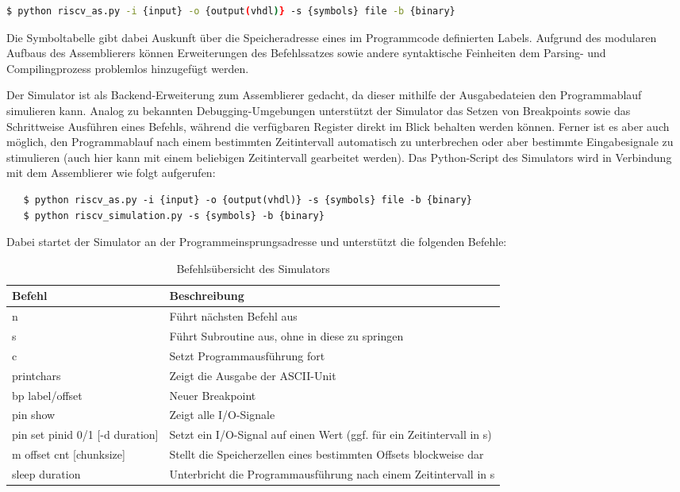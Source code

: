 \begin{lstlisting}[language=bash]
   $ python riscv_as.py -i {input} -o {output(vhdl)} -s {symbols} file -b {binary}
\end{lstlisting}

Die Symboltabelle gibt dabei Auskunft \"uber die Speicheradresse eines im Programmcode definierten Labels. Aufgrund des modularen Aufbaus des Assemblierers k\"onnen Erweiterungen des Befehlssatzes sowie andere syntaktische Feinheiten dem Parsing- und Compilingprozess problemlos hinzugef\"ugt werden.

 
Der Simulator ist als Backend-Erweiterung zum Assemblierer gedacht, da dieser mithilfe der Ausgabedateien den Programmablauf simulieren kann. Analog zu bekannten Debugging-Umgebungen unterst\"utzt der Simulator das Setzen von Breakpoints sowie das Schrittweise Ausf\"uhren eines Befehls, w\"ahrend die verf\"ugbaren Register direkt im Blick behalten werden k\"onnen. Ferner ist es aber auch m\"oglich, den Programmablauf nach einem bestimmten Zeitintervall automatisch zu unterbrechen oder aber bestimmte Eingabesignale zu stimulieren (auch hier kann mit einem beliebigen Zeitintervall gearbeitet werden). Das Python-Script des Simulators wird in Verbindung mit dem Assemblierer wie folgt aufgerufen:

\begin{lstlisting}
   $ python riscv_as.py -i {input} -o {output(vhdl)} -s {symbols} file -b {binary}
   $ python riscv_simulation.py -s {symbols} -b {binary}
\end{lstlisting}

Dabei startet der Simulator an der Programmeinsprungsadresse und unterst\"utzt die folgenden Befehle:

\begin{table}[h]
\begin{center}
	\begin{tabular}{| l | l |}
	\hline
		\textbf{Befehl} & \textbf{Beschreibung} \\ \hline
		n & F\"uhrt n\"achsten Befehl aus \\ \hline
		s & F\"uhrt Subroutine aus, ohne in diese zu springen\\ \hline
		c & Setzt Programmausf\"uhrung fort \\ \hline
		printchars & Zeigt die Ausgabe der ASCII-Unit\\ \hline
		bp {label/offset} & Neuer Breakpoint\\ \hline
		pin show & Zeigt alle I/O-Signale\\ \hline
		pin set {pinid} {0/1} [-d duration] & Setzt ein I/O-Signal auf einen Wert (ggf. f\"ur ein Zeitintervall in s)\\ \hline
		 m {offset} {cnt} [chunksize] & Stellt die Speicherzellen eines bestimmten Offsets blockweise dar\\ \hline
		 sleep {duration} & Unterbricht die Programmausf\"uhrung nach einem Zeitintervall in s\\ \hline 
	\end{tabular}
\end{center}
\caption{Befehls\"ubersicht des Simulators}
\end{table}

